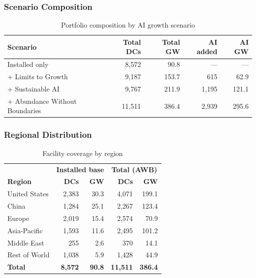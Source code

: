\subsubsection{Scenario Composition}

\begin{table}[H]
\centering
\small
\caption{Portfolio composition by AI growth scenario}
\label{tab:app_scenario_composition}
\begin{tabular}{@{}lrrrr@{}}
\toprule
\textbf{Scenario} & \textbf{Total DCs} & \textbf{Total GW} & \textbf{AI added} & \textbf{AI GW} \\
\midrule
Installed only & 8{,}572 & 90.8 & --- & --- \\
+ Limits to Growth & 9{,}187 & 153.7 & 615 & 62.9 \\
+ Sustainable AI & 9{,}767 & 211.9 & 1{,}195 & 121.1 \\
+ Abundance Without Boundaries & 11{,}511 & 386.4 & 2{,}939 & 295.6 \\
\bottomrule
\end{tabular}
\end{table}


\subsubsection{Regional Distribution}

\begin{table}[H]
\centering
\small
\caption{Facility coverage by region}
\label{tab:app_regional}
\begin{tabular}{@{}lrr|rr@{}}
\toprule
& \multicolumn{2}{c|}{\textbf{Installed base}} & \multicolumn{2}{c}{\textbf{Total (AWB)}} \\
\textbf{Region} & \textbf{DCs} & \textbf{GW} & \textbf{DCs} & \textbf{GW} \\
\midrule
United States & 2{,}383 & 30.3 & 4{,}071 & 199.1 \\
China & 1{,}284 & 25.1 & 2{,}267 & 123.4 \\
Europe & 2{,}019 & 15.4 & 2{,}574 & 70.9 \\
Asia-Pacific & 1{,}593 & 11.6 & 2{,}495 & 101.2 \\
Middle East & 255 & 2.6 & 370 & 14.1 \\
Rest of World & 1{,}038 & 5.9 & 1{,}428 & 44.9 \\
\midrule
\textbf{Total} & \textbf{8{,}572} & \textbf{90.8} & \textbf{11{,}511} & \textbf{386.4} \\
\bottomrule
\end{tabular}
\end{table}

